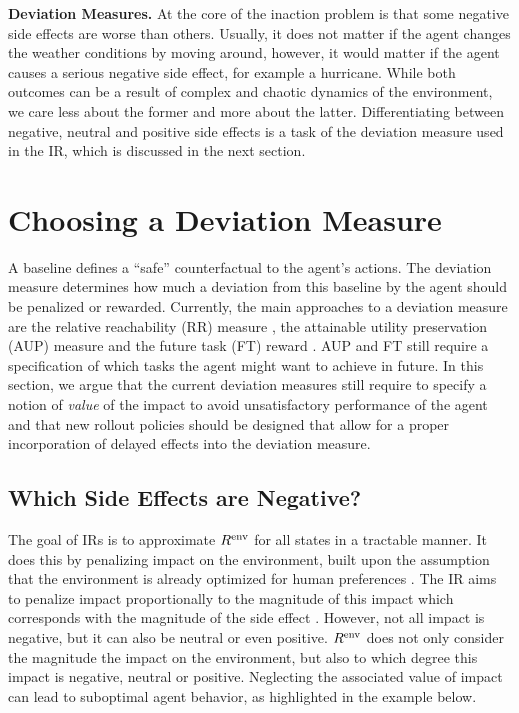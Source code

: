 \documentclass[letterpaper]{article} %
\newcommand{\Rframe}{R^{\textnormal{env}}}
\begin{document}
\textbf{Deviation Measures.} At the core of the inaction problem is that some negative side effects are worse than others. Usually, it does not matter if the agent changes the weather conditions by moving around, however, it would matter if the agent causes a serious negative side effect, for example a hurricane. While both outcomes can be a result of complex and chaotic dynamics of the environment, we care less about the former and more about the latter. Differentiating between negative, neutral and positive side effects is a task of the deviation measure used in the IR, which is discussed in the next section.

\section{Choosing a Deviation Measure}
\label{sec:distance_measure}
A baseline defines a ``safe'' counterfactual to the agent's actions. The deviation measure determines how much a deviation from this baseline by the agent should be penalized or rewarded. Currently, the main approaches to a deviation measure are the relative reachability (RR) measure \citep{krakovna2018penalizing}, the attainable utility preservation (AUP) measure \citep{turner2020conservative} and the future task (FT) reward \citep{krakovna2020avoiding}. AUP and FT still require a specification of which tasks the agent might want to achieve in future. In this section, we argue that the current deviation measures still require to specify a notion of \emph{value} of the impact to avoid unsatisfactory performance of the agent and that new rollout policies should be designed that allow for a proper incorporation of delayed effects into the deviation measure.

\subsection{Which Side Effects are Negative?}
The goal of IRs is to approximate $\Rframe$ for all states in a tractable manner. It does this by penalizing impact on the environment, built upon the assumption that the environment is already optimized for human preferences \citep{Shah2018}. 
The IR aims to penalize impact proportionally to the magnitude of this impact which corresponds with the magnitude of the side effect \citep{krakovna2018penalizing, turner2020conservative}. However, not all impact is negative, but it can also be neutral or even positive. $\Rframe$ does not only consider the magnitude the impact on the environment, but also to which degree this impact is negative, neutral or positive. Neglecting the associated value of impact can lead to suboptimal agent behavior, as highlighted in the example below.
\end{document}
